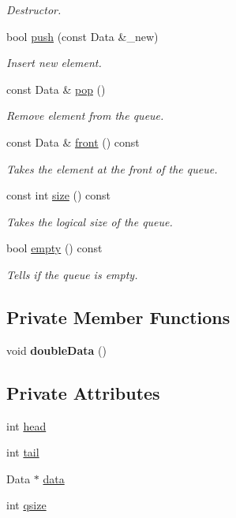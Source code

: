 \begin{DoxyCompactItemize}
\begin{DoxyCompactList}\small\item\em Destructor. \end{DoxyCompactList}\item 
bool \hyperlink{classQueue_a62ef5c3748c7c4eaa4caedf8b059e7d7}{push} (const Data \&\+\_\+new)
\begin{DoxyCompactList}\small\item\em Insert new element. \end{DoxyCompactList}\item 
const Data \& \hyperlink{classQueue_acd598fa32722961e46af7637fdf96f56}{pop} ()
\begin{DoxyCompactList}\small\item\em Remove element from the queue. \end{DoxyCompactList}\item 
const Data \& \hyperlink{classQueue_ada2a7831e194841f7860e6c92f223588}{front} () const 
\begin{DoxyCompactList}\small\item\em Takes the element at the front of the queue. \end{DoxyCompactList}\item 
const int \hyperlink{classQueue_a5c6da770b955acea2e61fde3d542ba69}{size} () const 
\begin{DoxyCompactList}\small\item\em Takes the logical size of the queue. \end{DoxyCompactList}\item 
bool \hyperlink{classQueue_ae0b482114ae63bf6c541e04ca730436f}{empty} () const 
\begin{DoxyCompactList}\small\item\em Tells if the queue is empty. \end{DoxyCompactList}\end{DoxyCompactItemize}
\subsection*{Private Member Functions}
\begin{DoxyCompactItemize}
\item 
void {\bfseries double\+Data} ()\hypertarget{classQueue_ad536cdbfc95939595cc946a2f6b03078}{}\label{classQueue_ad536cdbfc95939595cc946a2f6b03078}

\end{DoxyCompactItemize}
\subsection*{Private Attributes}
\begin{DoxyCompactItemize}
\item 
int \hyperlink{classQueue_ab33f3d6f9719400931f35c1639650069}{head}
\item 
int \hyperlink{classQueue_ab10ac5c08c3e0b047fca58f67fb06148}{tail}
\item 
Data $\ast$ \hyperlink{classQueue_a745cca9cdc31e5211fd8998979a1d555}{data}
\item 
int \hyperlink{classQueue_a9bfa5d2a390a36f141191ae93e144d87}{qsize}
\end{DoxyCompactItemize}
